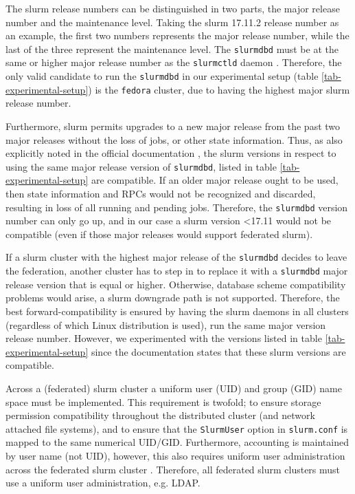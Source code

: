 \documentclass[conference]{IEEEtran}
\begin{document}
The \gls{slurm} release numbers can be distinguished in two parts, the major release number and the maintenance level. Taking the \gls{slurm} 17.11.2 release number as an example, the first two numbers represents the major release number, while the last of the three represent the maintenance level. The \texttt{slurmdbd} must be at the same or higher major release number as the \texttt{slurmctld} daemon \cite{slurm-upgrade-guide}. Therefore, the only valid candidate to run the \texttt{slurmdbd} in our experimental setup (table \ref{tab-experimental-setup}) is the \texttt{fedora} cluster, due to having the highest major \gls{slurm} release number.

Furthermore, \gls{slurm} permits upgrades to a new major release from the past two major releases without the loss of jobs, or other state information. Thus, as also explicitly noted in the official documentation \cite{slurm-upgrade-guide}, the \gls{slurm} versions in respect to using the same major release version of \texttt{slurmdbd}, listed in table \ref{tab-experimental-setup} are compatible. If an older major release ought to be used, then state information and RPCs would not be recognized and discarded, resulting in loss of all running and pending jobs. Therefore, the \texttt{slurmdbd} version number can only go up, and in our case a \gls{slurm} version \textless 17.11 would not be compatible (even if those major releases would support federated \gls{slurm}).

If a \gls{slurm} cluster with the highest major release of the \texttt{slurmdbd} decides to leave the federation, another cluster has to step in to replace it with a \texttt{slurmdbd} major release version that is equal or higher. Otherwise, database scheme compatibility problems would arise, a \gls{slurm} downgrade path is not supported. Therefore, the best forward-compatibility is ensured by having the \gls{slurm} daemons in all clusters (regardless of which Linux distribution is used), run the same major version release number. However, we experimented with the versions listed in table \ref{tab-experimental-setup} since the documentation states that these \gls{slurm} versions are compatible.

Across a (federated) \gls{slurm} cluster a uniform user (UID) and group (GID) name space must be implemented. This requirement is twofold; to ensure storage permission compatibility throughout the distributed cluster (and network attached file systems), and to ensure that the \texttt{SlurmUser} option in \texttt{slurm.conf} is mapped to the same numerical UID/GID. Furthermore, accounting is maintained by user name (not UID), however, this also requires uniform user administration across the federated \gls{slurm} cluster \cite{slurm-accounting}. Therefore, all federated \gls{slurm} clusters must use a uniform user administration, e.g. LDAP.
\end{document}
